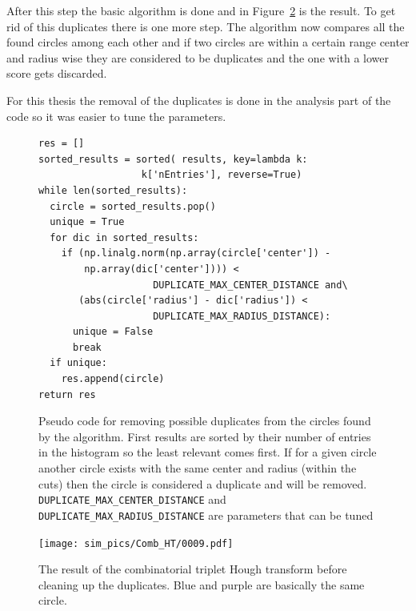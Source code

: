 \documentclass[11pt,twoside]{scrreprt}
\begin{document}
After this step the basic algorithm is done and in Figure~\ref{fig:comb_ht_0009} is the result. To get rid of this duplicates there is one more step.
The algorithm now compares all the found circles among each other and if two circles are within a certain range center and radius wise
they are considered to be duplicates and the one with a lower score gets discarded.

For this thesis the removal of the duplicates is done in the analysis part of the code so it was easier to tune the parameters.
\begin{figure}[htb]
\centering
  \begin{lstlisting}
res = []
sorted_results = sorted( results, key=lambda k: 
                  k['nEntries'], reverse=True)
while len(sorted_results):
  circle = sorted_results.pop()
  unique = True
  for dic in sorted_results:
    if (np.linalg.norm(np.array(circle['center']) - 
        np.array(dic['center']))) < 
                    DUPLICATE_MAX_CENTER_DISTANCE and\
       (abs(circle['radius'] - dic['radius']) < 
                    DUPLICATE_MAX_RADIUS_DISTANCE):
      unique = False
      break
  if unique:
    res.append(circle)
return res
\end{lstlisting}
\caption[Pseudo code for removing possible duplicates]{Pseudo code for removing possible duplicates from the circles found by the algorithm. First results are sorted by their number of entries
in the histogram so the least relevant comes first. If for a given circle another circle exists with the same center and radius (within the cuts)
then the circle is considered a duplicate and will be removed. \texttt{DUPLICATE\_MAX\_CENTER\_DISTANCE} and \texttt{DUPLICATE\_MAX\_RADIUS\_DISTANCE} are 
parameters that can be tuned}\label{fig:dup_code}
\end{figure}


\begin{figure}[htb]
  \centering
  \texttt{[image: sim\_pics/Comb\_HT/0009.pdf]}
  \caption{The result of the combinatorial triplet Hough transform before cleaning up the duplicates. Blue and purple are basically the same circle.}
  \label{fig:comb_ht_0009}
\end{figure}
\end{document}
